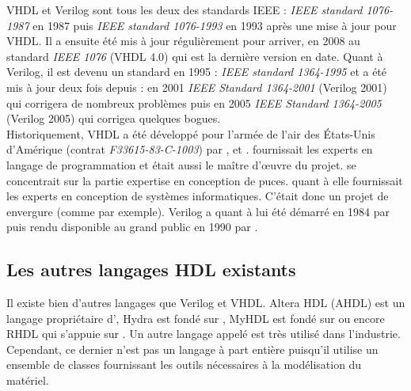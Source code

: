 \vspace{10px}
VHDL et Verilog sont tous les deux des standards IEEE : \textit{IEEE standard 1076-1987}
\cite{IEEE_VHDL_87}
en 1987 puis \textit{IEEE standard 1076-1993}
\cite{IEEE_VHDL_93}
 en 1993 après une mise à jour pour VHDL. Il a ensuite été mis à jour régulièrement pour arriver, en 2008 au standard \textit{IEEE 1076}
\cite{IEEE_VHDL}
 (VHDL 4.0) qui est la dernière version en date. Quant à Verilog, il est devenu un standard en 1995 : \textit{IEEE standard 1364-1995}
\cite{IEEE_VERILOG_1995}
et a été mis à jour deux fois depuis : en 2001 \textit{IEEE Standard 1364-2001}
\cite{IEEE_VERILOG_2001}
(Verilog 2001) qui corrigera de nombreux problèmes puis en 2005 \textit{IEEE Standard 1364-2005}
\cite{IEEE_VERILOG_2005}
(Verilog 2005) qui corrigea quelques bogues.\\

Historiquement, VHDL a été développé pour l'armée de l'air des États-Unis d'Amérique (contrat \textit{F33615-83-C-1003}) par ,  et .  fournissait les experts en langage de programmation et était aussi le maître d'\oe{}uvre du projet.  se concentrait sur la partie expertise en conception de puces.  quant à elle fournissait les experts en conception de systèmes informatiques. C'était donc un projet de envergure (comme  par exemple). Verilog a quant à lui été démarré en 1984 par  puis rendu disponible au grand public en 1990 par .

\subsection{Les autres langages HDL existants}

Il existe bien d'autres langages que Verilog et VHDL. Altera HDL (AHDL) est un langage propriétaire d', Hydra est fondé sur , MyHDL est fondé sur  ou encore RHDL qui s'appuie sur . Un autre langage appelé  est très utilisé dans l'industrie. Cependant, ce dernier n'est pas un langage à part entière puisqu'il utilise un ensemble de classes  fournissant les outils nécessaires à la modélisation du matériel. 
